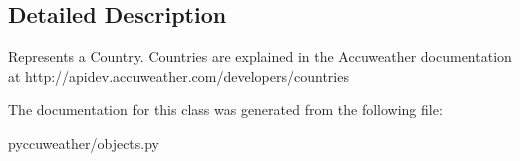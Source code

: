 \subsection{Detailed Description}
\begin{DoxyVerb}Represents a Country.
Countries are explained in the Accuweather documentation at http://apidev.accuweather.com/developers/countries
\end{DoxyVerb}
 

The documentation for this class was generated from the following file\+:\begin{DoxyCompactItemize}
\item 
pyccuweather/objects.\+py\end{DoxyCompactItemize}

